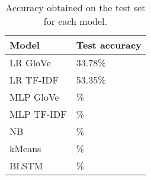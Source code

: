 \begin{table}
\caption{Accuracy obtained on the test set for each model.}
\label{tab:res_acc}
\begin{center}
\begin{tabular}{l | l}
\toprule
Model & Test accuracy \\
\midrule
LR GloVe & 33.78\% \\
\midrule
LR TF-IDF & 53.35\% \\
\midrule
MLP GloVe & \% \\
\midrule
MLP TF-IDF & \% \\
\midrule
NB & \% \\
\midrule
kMeans & \% \\
\midrule
BLSTM & \% \\
\bottomrule
\end{tabular}
\end{center}
\end{table}
